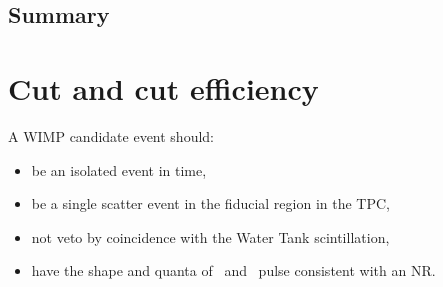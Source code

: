 \subsection{Summary}

\section{Cut and cut efficiency}
 A WIMP candidate event should:
 \begin{itemize}
 	\item be an isolated event in time,
 	\item be a single scatter event in the fiducial region in the TPC,
 	\item not veto by coincidence with the Water Tank scintillation,
 	\item have the shape and quanta of \sone\ and \stwo\ pulse consistent with an NR.
 \end{itemize}
